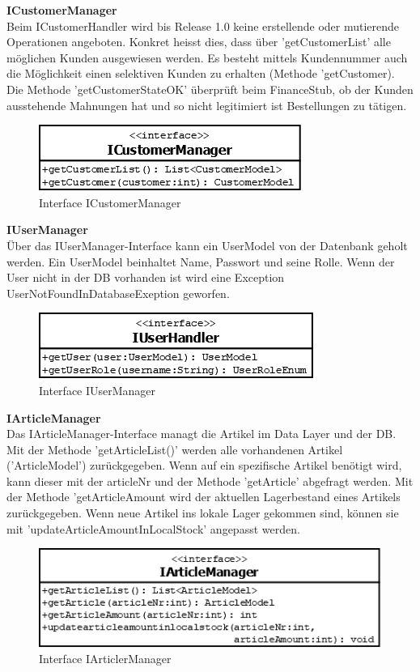 \textbf{ICustomerManager}\\
Beim ICustomerHandler wird bis Release 1.0 keine erstellende oder mutierende Operationen angeboten. Konkret heisst dies, dass über 'getCustomerList' alle möglichen Kunden ausgewiesen werden. Es besteht mittels Kundennummer auch die Möglichkeit einen selektiven Kunden zu erhalten (Methode 'getCustomer).\\
Die Methode 'getCustomerStateOK' überprüft beim FinanceStub, ob der Kunden ausstehende Mahnungen hat und so nicht legitimiert ist Bestellungen zu tätigen.
\begin{figure}[H]
	\includegraphics[width=0.4\linewidth]{Images/ICustomerManager}
	\caption{Interface ICustomerManager}
	\label{fig:if-ICustomerManager}
\end{figure}



\textbf{IUserManager}\\
Über das IUserManager-Interface kann ein UserModel von der Datenbank geholt werden. Ein UserModel beinhaltet Name, Passwort und seine Rolle. Wenn der User nicht in der DB vorhanden ist wird eine Exception UserNotFoundInDatabaseExeption geworfen.
\begin{figure}[H]
	\includegraphics[width=0.4\linewidth]{Images/IUserManager}
	\caption{Interface IUserManager}
	\label{fig:if-IUserManager}
\end{figure}




\textbf{IArticleManager}\\
Das IArticleManager-Interface managt die Artikel im Data Layer und der DB. Mit der Methode 'getArticleList()' werden alle vorhandenen Artikel ('ArticleModel') zurückgegeben. Wenn auf ein spezifische Artikel benötigt wird, kann dieser mit der articleNr und der Methode 'getArticle' abgefragt werden. Mit der Methode 'getArticleAmount wird der aktuellen Lagerbestand eines Artikels zurückgegeben. Wenn neue Artikel ins lokale Lager gekommen sind, können sie mit 'updateArticleAmountInLocalStock' angepasst werden. 
\begin{figure}[H]
	\includegraphics[width=0.6\linewidth]{Images/IArticleManager}
	\caption{Interface IArticlerManager}
	\label{fig:if-IArticleManager}
\end{figure}


